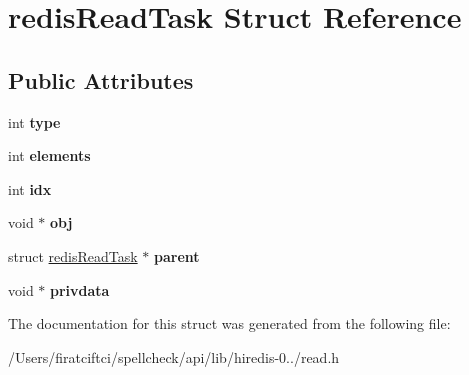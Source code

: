 \hypertarget{structredis_read_task}{}\section{redis\+Read\+Task Struct Reference}
\label{structredis_read_task}
\subsection*{Public Attributes}
\begin{DoxyCompactItemize}
\item 
\mbox{\label{structredis_read_task_a5d4a4d7982388a9e4279a29992347701}} 
int {\bfseries type}
\item 
\mbox{\label{structredis_read_task_a05d573c401dfa561dadcf3d7fab12240}} 
int {\bfseries elements}
\item 
\mbox{\label{structredis_read_task_ad2b467d141591945b8ae2fa15a8149c1}} 
int {\bfseries idx}
\item 
\mbox{\label{structredis_read_task_a7c29675175129f56c513effb756a8ac8}} 
void $\ast$ {\bfseries obj}
\item 
\mbox{\label{structredis_read_task_a8ca682f575a18cae9207a81e3c10db1d}} 
struct \mbox{\hyperlink{structredis_read_task}{redis\+Read\+Task}} $\ast$ {\bfseries parent}
\item 
\mbox{\label{structredis_read_task_af98c4f81471ba383dde5e89fdbceedaa}} 
void $\ast$ {\bfseries privdata}
\end{DoxyCompactItemize}


The documentation for this struct was generated from the following file\+:\begin{DoxyCompactItemize}
\item 
/\+Users/firatciftci/spellcheck/api/lib/hiredis-\/0../read.\+h\end{DoxyCompactItemize}
